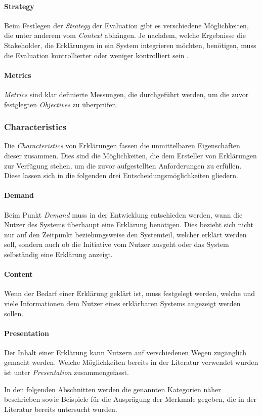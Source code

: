 \paragraph{Strategy} Beim Festlegen der \textit{Strategy} der Evaluation gibt es verschiedene Möglichkeiten, die unter anderem vom \textit{Context} abhängen. Je nachdem, welche Ergebnisse die Stakeholder, die Erklärungen in ein System integrieren möchten, benötigen, muss die Evaluation kontrollierter oder weniger kontrolliert sein \cite[vgl.][]{wohlin2012experimentation}.

\paragraph{Metrics} \textit{Metrics} sind klar definierte Messungen, die durchgeführt werden, um die zuvor festglegten \textit{Objectives} zu überprüfen.

\subsubsection{Characteristics}

Die \textit{Characteristics} von Erklärungen fassen die unmittelbaren Eigenschaften dieser zusammen. Dies sind die Möglichkeiten, die dem Ersteller von Erklärungen zur Verfügung stehen, um die zuvor aufgestellten Anforderungen zu erfüllen. Diese lassen sich in die folgenden drei Entscheidungsmöglichkeiten gliedern.

\paragraph{Demand} Beim Punkt \textit{Demand} muss in der Entwicklung entschieden werden, wann die Nutzer des Systems überhaupt eine Erklärung benötigen. Dies bezieht sich nicht nur auf den Zeitpunkt beziehungsweise den Systemteil, welcher erklärt werden soll, sondern auch ob die Initiative vom Nutzer ausgeht oder das System selbständig eine Erklärung anzeigt.

\paragraph{Content} Wenn der Bedarf einer Erklärung geklärt ist, muss festgelegt werden, welche und viele Informationen dem Nutzer eines erklärbaren Systems angezeigt werden sollen.

\paragraph{Presentation} Der Inhalt einer Erklärung kann Nutzern auf verschiedenen Wegen zugänglich gemacht werden. Welche Möglichkeiten bereits in der Literatur verwendet wurden ist unter \textit{Presentation} zusammengefasst.

\bigskip

In den folgenden Abschnitten werden die genannten Kategorien näher beschrieben sowie Beispiele für die Ausprägung der Merkmale gegeben, die in der Literatur bereits untersucht wurden.